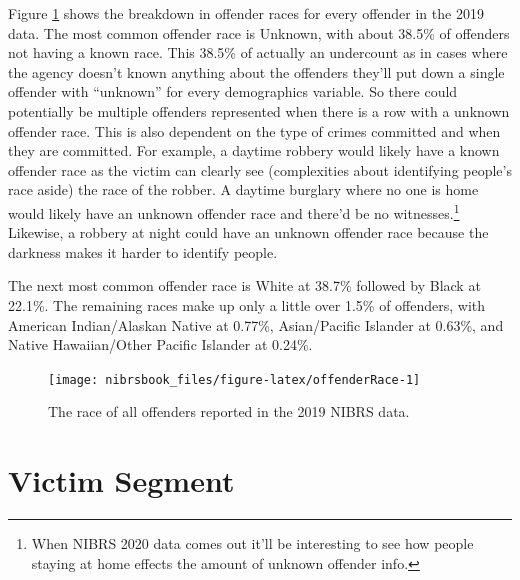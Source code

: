 \documentclass[
  12pt,
  openany]{book}
\begin{document}
Figure \ref{fig:offenderRace} shows the breakdown in offender races for every offender in the 2019 data. The most common offender race is Unknown, with about 38.5\% of offenders not having a known race. This 38.5\% of actually an undercount as in cases where the agency doesn't known anything about the offenders they'll put down a single offender with ``unknown'' for every demographics variable. So there could potentially be multiple offenders represented when there is a row with a unknown offender race. This is also dependent on the type of crimes committed and when they are committed. For example, a daytime robbery would likely have a known offender race as the victim can clearly see (complexities about identifying people's race aside) the race of the robber. A daytime burglary where no one is home would likely have an unknown offender race and there'd be no witnesses.\footnote{When NIBRS 2020 data comes out it'll be interesting to see how people staying at home effects the amount of unknown offender info.} Likewise, a robbery at night could have an unknown offender race because the darkness makes it harder to identify people.

The next most common offender race is White at 38.7\% followed by Black at 22.1\%. The remaining races make up only a little over 1.5\% of offenders, with American Indian/Alaskan Native at 0.77\%, Asian/Pacific Islander at 0.63\%, and Native Hawaiian/Other Pacific Islander at 0.24\%.

\begin{figure}

{\centering \texttt{[image: nibrsbook\_files/figure-latex/offenderRace-1]} 

}

\caption{The race of all offenders reported in the 2019 NIBRS data.}\label{fig:offenderRace}
\end{figure}

\hypertarget{victim-segment-1}{%
\chapter{Victim Segment}\label{victim-segment-1}}
\end{document}
